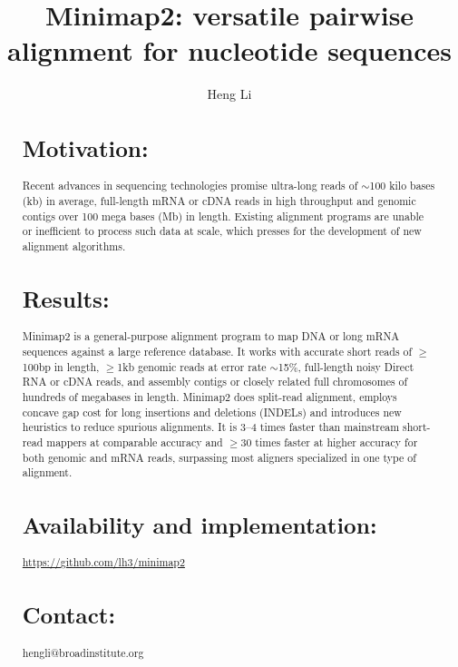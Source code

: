 \documentclass{bioinfo}
\begin{document}

\title[Aligning nucleotide sequences with minimap2]{Minimap2: versatile pairwise alignment for nucleotide sequences}
\author[Li]{Heng Li}
\address{Broad Institute, 415 Main Street, Cambridge, MA 02142, USA}

\maketitle

\begin{abstract}

\section{Motivation:} Recent advances in sequencing technologies promise
ultra-long reads of $\sim$100 kilo bases (kb) in average, full-length mRNA or
cDNA reads in high throughput and genomic contigs over 100 mega bases (Mb) in
length. Existing alignment programs are unable or inefficient to process such data
at scale, which presses for the development of new alignment algorithms.

\section{Results:} Minimap2 is a general-purpose alignment program to map DNA or long
mRNA sequences against a large reference database. It works with accurate short
reads of $\ge$100bp in length, $\ge$1kb genomic reads at error rate $\sim$15\%,
full-length noisy Direct RNA or cDNA reads, and assembly contigs or closely
related full chromosomes of hundreds of megabases in length. Minimap2 does
split-read alignment, employs concave gap cost for long insertions and
deletions (INDELs) and introduces new heuristics to reduce spurious alignments.
It is 3--4 times faster than mainstream short-read mappers at comparable
accuracy and $\ge$30 times faster at higher accuracy for both genomic and mRNA
reads, surpassing most aligners specialized in one type of alignment.

\section{Availability and implementation:}
\href{https://github.com/lh3/minimap2}{https://github.com/lh3/minimap2}

\section{Contact:} hengli@broadinstitute.org
\end{abstract}
\end{document}
